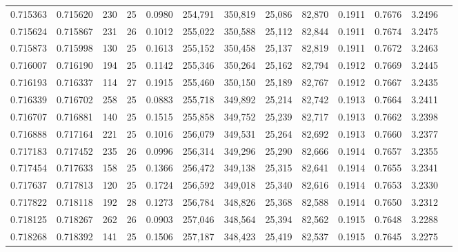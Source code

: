 \begin{tabular}{rrrrrrrrrrrrr}
0.715363 & 0.715620 &   230 &  25 &                                     0.0980 & 254,791 & 350,819 &  25,086 &  82,870 & 0.1911 & 0.7676 & 3.2496 \\
0.715624 & 0.715867 &   231 &  26 &                                     0.1012 & 255,022 & 350,588 &  25,112 &  82,844 & 0.1911 & 0.7674 & 3.2475 \\
0.715873 & 0.715998 &   130 &  25 &                                     0.1613 & 255,152 & 350,458 &  25,137 &  82,819 & 0.1911 & 0.7672 & 3.2463 \\
0.716007 & 0.716190 &   194 &  25 &                                     0.1142 & 255,346 & 350,264 &  25,162 &  82,794 & 0.1912 & 0.7669 & 3.2445 \\
0.716193 & 0.716337 &   114 &  27 &                                     0.1915 & 255,460 & 350,150 &  25,189 &  82,767 & 0.1912 & 0.7667 & 3.2435 \\
0.716339 & 0.716702 &   258 &  25 &                                     0.0883 & 255,718 & 349,892 &  25,214 &  82,742 & 0.1913 & 0.7664 & 3.2411 \\
0.716707 & 0.716881 &   140 &  25 &                                     0.1515 & 255,858 & 349,752 &  25,239 &  82,717 & 0.1913 & 0.7662 & 3.2398 \\
0.716888 & 0.717164 &   221 &  25 &                                     0.1016 & 256,079 & 349,531 &  25,264 &  82,692 & 0.1913 & 0.7660 & 3.2377 \\
0.717183 & 0.717452 &   235 &  26 &                                     0.0996 & 256,314 & 349,296 &  25,290 &  82,666 & 0.1914 & 0.7657 & 3.2355 \\
0.717454 & 0.717633 &   158 &  25 &                                     0.1366 & 256,472 & 349,138 &  25,315 &  82,641 & 0.1914 & 0.7655 & 3.2341 \\
0.717637 & 0.717813 &   120 &  25 &                                     0.1724 & 256,592 & 349,018 &  25,340 &  82,616 & 0.1914 & 0.7653 & 3.2330 \\
0.717822 & 0.718118 &   192 &  28 &                                     0.1273 & 256,784 & 348,826 &  25,368 &  82,588 & 0.1914 & 0.7650 & 3.2312 \\
0.718125 & 0.718267 &   262 &  26 &                                     0.0903 & 257,046 & 348,564 &  25,394 &  82,562 & 0.1915 & 0.7648 & 3.2288 \\
0.718268 & 0.718392 &   141 &  25 &                                     0.1506 & 257,187 & 348,423 &  25,419 &  82,537 & 0.1915 & 0.7645 & 3.2275 \\

\end{tabular}
